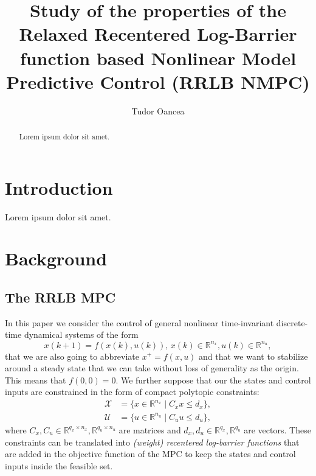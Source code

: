 \documentclass[conference]{IEEEtran}
\theoremstyle{definition}
\theoremstyle{remark}
\newcommand{\R}{\mathbb{R}}
\begin{document}
\title{Study of the properties of the Relaxed Recentered Log-Barrier function based Nonlinear Model Predictive Control (RRLB NMPC)}

\author{Tudor Oancea}%
        

\maketitle

\begin{abstract}
    Lorem ipsum dolor sit amet.
\end{abstract}

\section{Introduction}
Lorem ipsum dolor sit amet.


\section{Background}

\subsection{The RRLB MPC}

In this paper we consider the control of general nonlinear time-invariant discrete-time dynamical systems of the form 
\begin{equation}
	\label{eq:sys}
	x(k+1) = f(x(k),u(k)),\, x(k)\in\R^{n_x}, u(k)\in\R^{n_u},
\end{equation}
that we are also going to abbreviate $x^+ = f(x,u)$ and that we want to stabilize around a steady state that we can take without loss of generality as the origin. 
This means that $f(0,0) = 0$.
We further suppose that our the states and control inputs are constrained in the form of compact polytopic constraints:
\begin{equation}
	\label{eq:constr}
	\begin{aligned}
		\mathcal{X} &= \{x\in\R^{n_x} \mid C_x x \leq d_x \},\\
		\mathcal{U} &= \{u\in\R^{n_u} \mid C_u u \leq d_u\},
	\end{aligned}
\end{equation}
where $C_x, C_u \in \R^{q_x \times n_x}, \R^{q_u \times n_u}$ are matrices and $d_x, d_u \in \R^{q_x}, \R^{q_u}$ are vectors.
These constraints can be translated into \textit{(weight) recentered log-barrier functions} that are added in the objective function of the MPC to keep the states and control inputs inside the feasible set.
\end{document}
